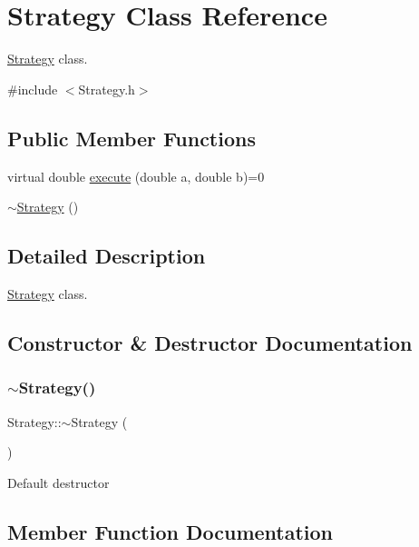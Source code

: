 \hypertarget{classStrategy}{}\section{Strategy Class Reference}
\label{classStrategy}


\hyperlink{classStrategy}{Strategy} class.  




{\ttfamily \#include $<$Strategy.\+h$>$}

\subsection*{Public Member Functions}
\begin{DoxyCompactItemize}
\item 
virtual double \hyperlink{classStrategy_a81b8d4f53494c438b21fc999c7ea59f4}{execute} (double a, double b)=0
\item 
\hyperlink{classStrategy_a37c0bbdd64fd7dfcdd91578784a64775}{$\sim$\+Strategy} ()
\end{DoxyCompactItemize}


\subsection{Detailed Description}
\hyperlink{classStrategy}{Strategy} class. 

\subsection{Constructor \& Destructor Documentation}
\mbox{\label{classStrategy_a37c0bbdd64fd7dfcdd91578784a64775}} 
\subsubsection{\texorpdfstring{$\sim$\+Strategy()}{~Strategy()}}
{\footnotesize\ttfamily Strategy\+::$\sim$\+Strategy (\begin{DoxyParamCaption}{ }\end{DoxyParamCaption})}

Default destructor 

\subsection{Member Function Documentation}
\mbox{\label{classStrategy_a81b8d4f53494c438b21fc999c7ea59f4}} 
